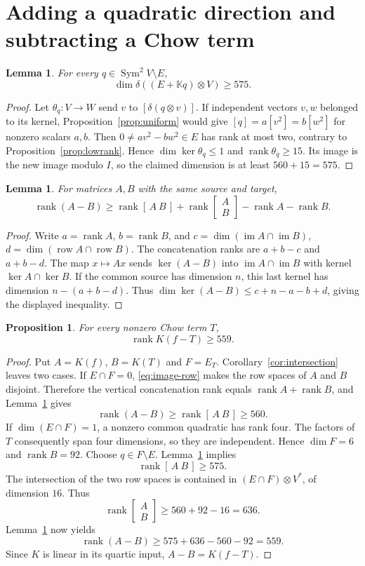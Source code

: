 \documentclass[11pt]{article}
\newtheorem{lemma}[theorem]{Lemma}
\newtheorem{proposition}[theorem]{Proposition}
\theoremstyle{remark}
\newcommand{\kk}{\mathbb K}
\newcommand{\Sym}{\operatorname{Sym}}
\newcommand{\rank}{\operatorname{rank}}
\newcommand{\im}{\operatorname{im}}
\newcommand{\row}{\operatorname{row}}
\begin{document}
\section{Adding a quadratic direction and subtracting a Chow term}
\begin{lemma}\label{lem:extension}
For every $q\in\Sym^2V\setminus E$,
\[
 \dim\delta((E+\kk q)\otimes V)\geq575.
\]
\end{lemma}
\begin{proof}
Let $\theta_q:V\to W$ send $v$ to $[\delta(q\otimes v)]$.
If independent vectors $v,w$ belonged to its kernel,
Proposition~\ref{prop:uniform} would give
$[q]=a[v^2]=b[w^2]$ for nonzero scalars $a,b$.
Then $0\ne av^2-bw^2\in E$ has rank at most two, contrary to
Proposition~\ref{prop:lowrank}. Hence $\dim\ker\theta_q\leq1$ and
$\rank\theta_q\geq15$. Its image is the new image modulo $I$, so the
claimed dimension is at least $560+15=575$.
\end{proof}

\begin{lemma}\label{lem:rank-inequality}
For matrices $A,B$ with the same source and target,
\[
 \rank(A-B)\geq\rank[\,A\ B\,]
 +\rank\begin{bmatrix}A\\B\end{bmatrix}-\rank A-\rank B.
\]
\end{lemma}
\begin{proof}
Write $a=\rank A$, $b=\rank B$, and
$c=\dim(\im A\cap\im B)$, $d=\dim(\row A\cap\row B)$.
The concatenation ranks are $a+b-c$ and $a+b-d$.
The map $x\mapsto Ax$ sends $\ker(A-B)$ into $\im A\cap\im B$
with kernel $\ker A\cap\ker B$. If the common source has dimension $n$,
this last kernel has dimension $n-(a+b-d)$.
Thus $\dim\ker(A-B)\leq c+n-a-b+d$, giving the displayed inequality.
\end{proof}

\begin{proposition}\label{prop:subtract}
For every nonzero Chow term $T$,
\[
 \rank K(f-T)\geq559.
\]
\end{proposition}
\begin{proof}
Put $A=K(f)$, $B=K(T)$ and $F=E_T$.
Corollary~\ref{cor:intersection} leaves two cases.
If $E\cap F=0$, \eqref{eq:image-row} makes the row spaces of $A$ and
$B$ disjoint. Therefore the vertical concatenation rank equals
$\rank A+\rank B$, and Lemma~\ref{lem:rank-inequality} gives
\[
 \rank(A-B)\geq\rank[\,A\ B\,]\geq560.
\]
If $\dim(E\cap F)=1$, a nonzero common quadratic has rank four.
The factors of $T$ consequently span four dimensions, so they are
independent. Hence $\dim F=6$ and $\rank B=92$.
Choose $q\in F\setminus E$. Lemma~\ref{lem:extension} implies
\[
 \rank[\,A\ B\,]\geq575.
\]
The intersection of the two row spaces is contained in
$(E\cap F)\otimes V^*$, of dimension $16$. Thus
\[
 \rank\begin{bmatrix}A\\B\end{bmatrix}\geq560+92-16=636.
\]
Lemma~\ref{lem:rank-inequality} now yields
\[
 \rank(A-B)\geq575+636-560-92=559.
\]
Since $K$ is linear in its quartic input, $A-B=K(f-T)$.
\end{proof}
\end{document}

